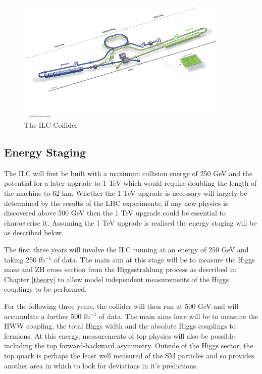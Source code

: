 \begin{figure}
  \centering
  \includegraphics[width=0.9\textwidth,keepaspectratio]{Experiments/fig/ILC}
  \caption[The ILC Experiment]{The \ac{ILC} Collider\cite{ILCTDR}}
  \label{Fig:ILC}
\end{figure}

\subsection{Energy Staging}

The \ac{ILC} will first be built with a maximum collision energy of 250 GeV and the potential for a later upgrade to 1 TeV which would require doubling the length of the machine to 62 km. Whether the 1 TeV upgrade is necessary will largely be determined by the results of the \ac{LHC} experiments; if any new physics is discovered above 500 GeV then the 1 TeV upgrade could be essential to characterise it. Assuming the 1 TeV upgrade is realised the energy staging will be as described below.

The first three years will involve the ILC running at an energy of 250 GeV and taking 250 fb${^{-1}}$ of data. The main aim at this stage will be to measure the Higgs mass and ZH cross section from the Higgsstrahlung process as described in Chapter \ref{theory} to allow model independent measurements of the Higgs couplings to be performed.

For the following three years, the collider will then run at 500 GeV and will accumulate a further 500 fb${^{-1}}$ of data. The main aims here will be to measure the HWW coupling, the total Higgs width and the absolute Higgs couplings to fermions. At this energy, measurements of top physics will also be possible including the top forward-backward asymmetry. Outside of the Higgs sector, the top quark is perhaps the least well measured of the \ac{SM} particles and so provides another area in which to look for deviations in it's predictions.


